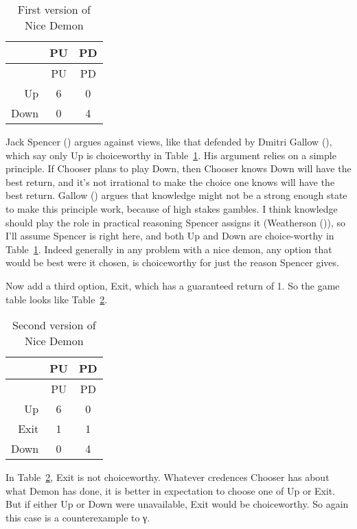 \documentclass[
  11pt,
  letterpaper,
  DIV=11,
  numbers=noendperiod,
  twoside]{scrartcl}
\begin{document}
\begin{longtable}[]{@{}rcc@{}}
\caption{First version of Nice
Demon}\label{tbl-nice-demon}\tabularnewline
\toprule\noalign{}
& PU & PD \\
\midrule\noalign{}
\endfirsthead
\toprule\noalign{}
& PU & PD \\
\midrule\noalign{}
\endhead
\bottomrule\noalign{}
\endlastfoot
Up & 6 & 0 \\
Down & 0 & 4 \\
\end{longtable}

Jack Spencer () argues against views,
like that defended by Dmitri Gallow (),
which say only Up is choiceworthy in Table~\ref{tbl-nice-demon}. His
argument relies on a simple principle. If Chooser plans to play Down,
then Chooser knows Down will have the best return, and it's not
irrational to make the choice one knows will have the best return.
Gallow () argues that knowledge might not
be a strong enough state to make this principle work, because of high
stakes gambles. I think knowledge should play the role in practical
reasoning Spencer assigns it (Weatherson
()), so I'll assume Spencer is right
here, and both Up and Down are choice-worthy in
Table~\ref{tbl-nice-demon}. Indeed generally in any problem with a nice
demon, any option that would be best were it chosen, is choiceworthy for
just the reason Spencer gives.

Now add a third option, Exit, which has a guaranteed return of 1. So the
game table looks like Table~\ref{tbl-nice-demon-exit}.

\begin{longtable}[]{@{}rcc@{}}
\caption{Second version of Nice
Demon}\label{tbl-nice-demon-exit}\tabularnewline
\toprule\noalign{}
& PU & PD \\
\midrule\noalign{}
\endfirsthead
\toprule\noalign{}
& PU & PD \\
\midrule\noalign{}
\endhead
\bottomrule\noalign{}
\endlastfoot
Up & 6 & 0 \\
Exit & 1 & 1 \\
Down & 0 & 4 \\
\end{longtable}

In Table~\ref{tbl-nice-demon-exit}, Exit is not choiceworthy. Whatever
credences Chooser has about what Demon has done, it is better in
expectation to choose one of Up or Exit. But if either Up or Down were
unavailable, Exit would be choiceworthy. So again this case is a
counterexample to γ.
\end{document}
